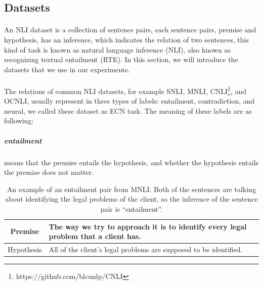 \documentclass{article}
\begin{document}
\begin{CJK*}{UTF8}{bkai}
\section{Datasets} \label{section:datasets}
\paragraph{}
An NLI dataset is a collection of sentence pairs, each sentence pairs, premise and hypothesis, has an inference, which indicates the relation of two sentences, this kind of task is known as natural language inference (NLI), also known as recognizing textual entailment (RTE). In this section, we will introduce the datasets that we use in our experiments.

\paragraph{}
The relations of common NLI datasets, for example SNLI\cite{snli:emnlp2015}, MNLI\cite{N18-1101}, CNLI\footnote{https://github.com/blcunlp/CNLI}, and OCNLI\cite{ocnli}, usually represent in three types of labels: entailment, contradiction, and neural, we called these dataset as ECN task. The meaning of these labels are as following:

\subparagraph{entailment} means that the premise entails the hypothesis, and whether the hypothesis entails the premise does not matter.
\begin{table}[ht!]
  \centering
  \begin{tabular}{|c|l|}
    \hline
    Premise & The way we try to approach it is to identify every legal problem that a client has. \\ \hline
    Hypothesis & All of the client's legal problems are supposed to be identified. \\ \hline
  \end{tabular}
  \caption[An example of an entailment pair from MNLI]{An example of an entailment pair from MNLI. Both of the sentences are talking about identifying the legal problems of the client, so the inference of the sentence pair is ``entailment''.}
\end{table}


\end{CJK*}
\end{document}

